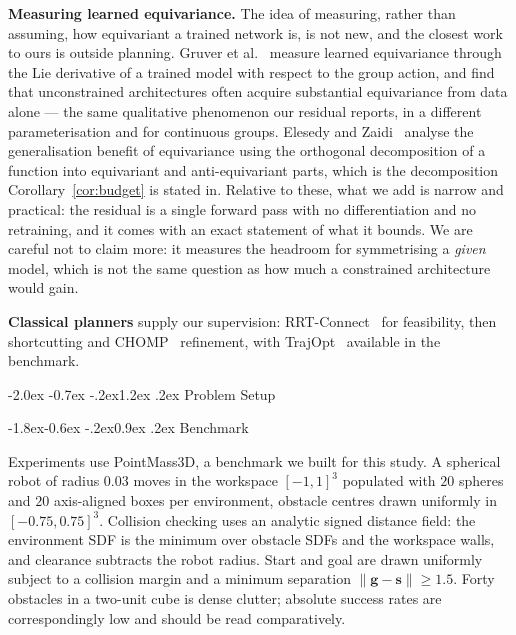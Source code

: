 \documentclass[10pt,twocolumn,letterpaper]{article}
\makeatletter
\renewcommand\section{\@startsection{section}{1}{\z@}%
  {-2.0ex \@plus -0.7ex \@minus -.2ex}{1.2ex \@plus.2ex}%
  {\centering\normalfont\large\bfseries}}
\renewcommand\subsection{\@startsection{subsection}{2}{\z@}%
  {-1.8ex\@plus -0.6ex \@minus -.2ex}{0.9ex \@plus .2ex}%
  {\normalfont\normalsize\bfseries}}
\theoremstyle{plain}
\newcommand{\svec}{\mathbf{s}}
\newcommand{\gvec}{\mathbf{g}}
\makeatother
\begin{document}
\textbf{Measuring learned equivariance.} The idea of measuring, rather than
assuming, how equivariant a trained network is, is not new, and the closest
work to ours is outside planning. Gruver et al.~\cite{gruver2023lie} measure
learned equivariance through the Lie derivative of a trained model with respect
to the group action, and find that unconstrained architectures often acquire
substantial equivariance from data alone --- the same qualitative phenomenon our
residual reports, in a different parameterisation and for continuous groups.
Elesedy and Zaidi~\cite{elesedy2021strict} analyse the generalisation benefit of
equivariance using the orthogonal decomposition of a function into equivariant
and anti-equivariant parts, which is the decomposition
Corollary~\ref{cor:budget} is stated in. Relative to these, what we add is
narrow and practical: the residual is a single forward pass with no
differentiation and no retraining, and it comes with an exact statement of what
it bounds. We are careful not to claim more: it measures the headroom for
symmetrising a \emph{given} model, which is not the same question as how much a
constrained architecture would gain.

\textbf{Classical planners} supply our supervision: RRT-Connect~\cite{kuffner2000rrtconnect}
for feasibility, then shortcutting and CHOMP~\cite{zucker2013chomp} refinement, with
TrajOpt~\cite{schulman2014trajopt} available in the benchmark.

\section{Problem Setup}

\subsection{Benchmark}

Experiments use PointMass3D, a benchmark we built for this study. A spherical
robot of radius $0.03$ moves in the workspace $[-1,1]^3$ populated with $20$
spheres and $20$ axis-aligned boxes per environment, obstacle centres drawn
uniformly in $[-0.75,0.75]^3$. Collision checking uses an analytic signed distance
field: the environment SDF is the minimum over obstacle SDFs and the workspace
walls, and clearance subtracts the robot radius. Start and goal are drawn
uniformly subject to a collision margin and a minimum separation
$\|\gvec-\svec\| \ge 1.5$. Forty obstacles in a two-unit cube is dense clutter;
absolute success rates are correspondingly low and should be read comparatively.
\end{document}
